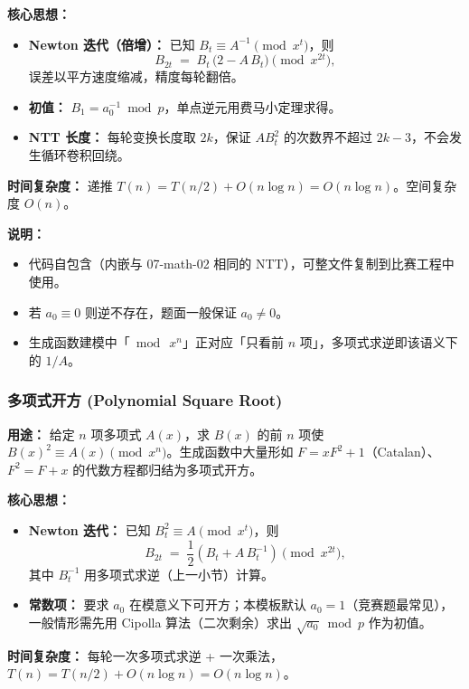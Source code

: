 \textbf{核心思想：}
\begin{itemize}
    \item \textbf{Newton 迭代（倍增）：} 已知 $B_t \equiv A^{-1} \pmod{x^t}$，则
    \[ B_{2t} \;=\; B_t\,\bigl(2 - A\,B_t\bigr) \pmod{x^{2t}}, \]
    误差以平方速度缩减，精度每轮翻倍。
    \item \textbf{初值：} $B_1 = a_0^{-1} \bmod p$，单点逆元用费马小定理求得。
    \item \textbf{NTT 长度：} 每轮变换长度取 $2k$，保证 $A B_t^2$ 的次数界不超过 $2k-3$，不会发生循环卷积回绕。
\end{itemize}

\textbf{时间复杂度：} 递推 $T(n)=T(n/2)+O(n\log n)=O(n\log n)$。空间复杂度 $O(n)$。



\textbf{说明：}
\begin{itemize}
    \item 代码自包含（内嵌与 07-math-02 相同的 NTT），可整文件复制到比赛工程中使用。
    \item 若 $a_0 \equiv 0$ 则逆不存在，题面一般保证 $a_0 \ne 0$。
    \item 生成函数建模中「$\bmod\ x^n$」正对应「只看前 $n$ 项」，多项式求逆即该语义下的 $1/A$。
\end{itemize}

\subsubsection{多项式开方 (Polynomial Square Root)}

\textbf{用途：}  
给定 $n$ 项多项式 $A(x)$，求 $B(x)$ 的前 $n$ 项使 $B(x)^2 \equiv A(x) \pmod{x^n}$。生成函数中大量形如 $F=xF^2+1$（Catalan）、$F^2=F+x$ 的代数方程都归结为多项式开方。

\textbf{核心思想：}
\begin{itemize}
    \item \textbf{Newton 迭代：} 已知 $B_t^2 \equiv A \pmod{x^t}$，则
    \[ B_{2t} \;=\; \frac{1}{2}\left(B_t + A\,B_t^{-1}\right) \pmod{x^{2t}}, \]
    其中 $B_t^{-1}$ 用多项式求逆（上一小节）计算。
    \item \textbf{常数项：} 要求 $a_0$ 在模意义下可开方；本模板默认 $a_0=1$（竞赛题最常见），一般情形需先用 Cipolla 算法（二次剩余）求出 $\sqrt{a_0} \bmod p$ 作为初值。
\end{itemize}

\textbf{时间复杂度：} 每轮一次多项式求逆 + 一次乘法，$T(n)=T(n/2)+O(n\log n)=O(n\log n)$。

